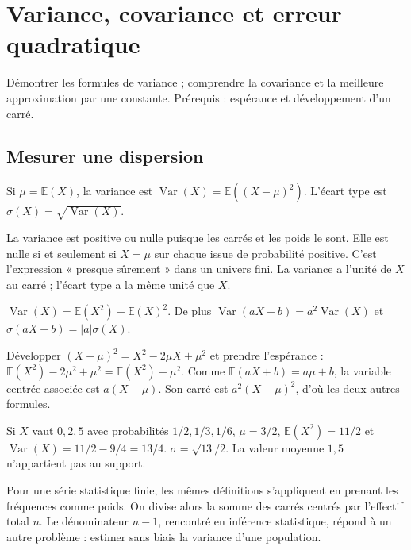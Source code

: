 \documentclass[../cours_1re.tex]{subfiles}
\begin{document}
\setcounter{chapter}{21}
\chapter{Variance, covariance et erreur quadratique}
\label{ch:22}
\begin{objectif}
Démontrer les formules de variance ; comprendre la covariance et la meilleure approximation par une constante.
Prérequis : espérance et développement d'un carré.
\end{objectif}
\section{Mesurer une dispersion}
\begin{definition}
Si $\mu=\mathbb E(X)$, la variance est
$\operatorname{Var}(X)=\mathbb E((X-\mu)^2)$.
L'écart type est $\sigma(X)=\sqrt{\operatorname{Var}(X)}$.
\end{definition}
La variance est positive ou nulle puisque les carrés et les poids le sont.
Elle est nulle si et seulement si $X=\mu$ sur chaque issue de probabilité positive.
C'est l'expression « presque sûrement » dans un univers fini.
La variance a l'unité de $X$ au carré ; l'écart type a la même unité que $X$.

\begin{theoreme}
$\operatorname{Var}(X)=\mathbb E(X^2)-\mathbb E(X)^2$.
De plus $\operatorname{Var}(aX+b)=a^2\operatorname{Var}(X)$
et $\sigma(aX+b)=|a|\sigma(X)$.
\end{theoreme}
\begin{demonstration}
Développer $(X-\mu)^2=X^2-2\mu X+\mu^2$ et prendre l'espérance :
$\mathbb E(X^2)-2\mu^2+\mu^2=\mathbb E(X^2)-\mu^2$.
Comme $\mathbb E(aX+b)=a\mu+b$, la variable centrée associée est
$a(X-\mu)$. Son carré est $a^2(X-\mu)^2$, d'où les deux autres formules.
\end{demonstration}
\begin{exemple}
Si $X$ vaut $0,2,5$ avec probabilités $1/2,1/3,1/6$,
$\mu=3/2$, $\mathbb E(X^2)=11/2$ et
$\operatorname{Var}(X)=11/2-9/4=13/4$.
$\sigma=\sqrt{13}/2$. La valeur moyenne $1{,}5$ n'appartient pas au support.
\end{exemple}
Pour une série statistique finie, les mêmes définitions s'appliquent en prenant
les fréquences comme poids. On divise alors la somme des carrés centrés par
l'effectif total $n$. Le dénominateur $n-1$, rencontré en inférence statistique,
répond à un autre problème : estimer sans biais la variance d'une population.
\end{document}
